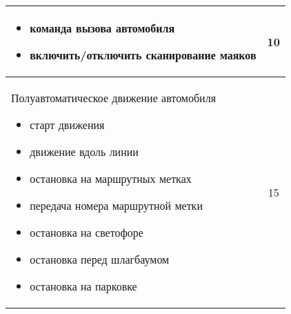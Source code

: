 \begin{table}[H]
\begin{tabular}{|p{14cm}|c|}
\begin{itemize}
            \item команда вызова автомобиля
            \item включить/отключить сканирование маяков                 
        \end{itemize} & 10 \\
        \hline
        Полуавтоматическое движение автомобиля
        \begin{itemize}
            \item старт движения
            \item движение вдоль линии
            \item остановка на маршрутных метках
            \item передача номера маршрутной метки
            \item остановка на светофоре
            \item остановка перед шлагбаумом
            \item остановка на парковке                         
        \end{itemize} & 15 \\
        \hline
        
    \end{tabular}
    
\end{table}

